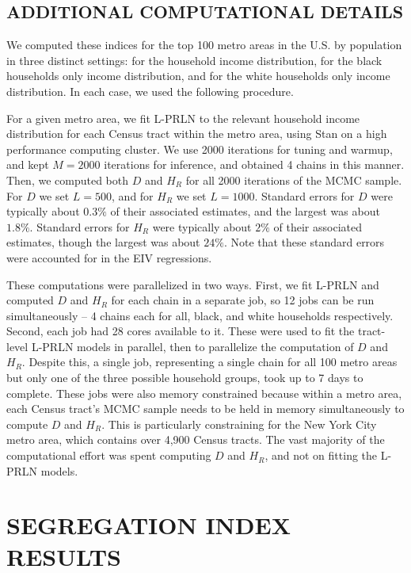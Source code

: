 \documentclass[12pt]{article}
\begin{document}
\subsection{ADDITIONAL COMPUTATIONAL DETAILS}
We computed these indices for the top 100 metro areas in the U.S. by population in three distinct settings: for the household income distribution, for the black households only income distribution, and for the white households only income distribution. In each case, we used the following procedure.

For a given metro area, we fit L-PRLN to the relevant household income distribution for each Census tract within the metro area, using Stan \citep{stan2017manual} on a high performance computing cluster. We use 2000 iterations for tuning and warmup, and kept $M=2000$ iterations for inference, and obtained 4 chains in this manner. Then, we computed both $D$ and $H_R$ for all 2000 iterations of the MCMC sample. For $D$ we set $L=500$, and for $H_R$ we set $L=1000$. Standard errors for $D$ were typically about $0.3\%$ of their associated estimates, and the largest was about $1.8\%$. Standard errors for $H_R$ were typically about $2\%$ of their associated estimates, though the largest was about $24\%$. Note that these standard errors were accounted for in the EIV regressions.

These computations were parallelized in two ways. First, we fit L-PRLN and computed $D$ and $H_R$ for each chain in a separate job, so 12 jobs can be run simultaneously -- 4 chains each for all, black, and white households respectively. Second, each job had 28 cores available to it. These were used to fit the tract-level L-PRLN models in parallel, then to parallelize the computation of $D$ and $H_R$. Despite this, a single job, representing a single chain for all 100 metro areas but only one of the three possible household groups, took up to 7 days to complete. These jobs were also memory constrained because within a metro area, each Census tract's MCMC sample needs to be held in memory simultaneously to compute $D$ and $H_R$. This is particularly constraining for the New York City metro area, which contains over 4,900 Census tracts. The vast majority of the computational effort was spent computing $D$ and $H_R$, and not on fitting the L-PRLN models.

\section{SEGREGATION INDEX RESULTS}\label{app:eiv.results}
\setcounter{table}{0}
\end{document}
